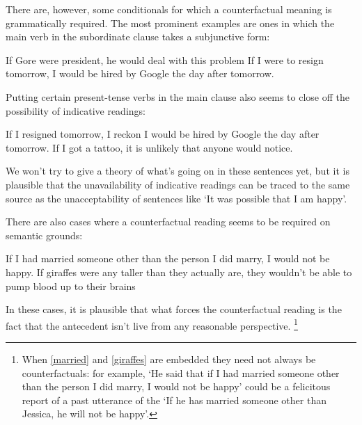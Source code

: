\documentclass[If.tex]{subfiles}
\begin{document}
There are, however, some conditionals for which a counterfactual meaning is grammatically required. The most prominent examples are ones in which the main verb in the subordinate clause takes a subjunctive form:
\begin{prop}
	\nitem 
		If Gore were president, he would deal with this problem
	\nitem 
		If I were to resign tomorrow, I would be hired by Google the day after tomorrow.
\end{prop}
Putting certain present-tense verbs in the main clause also seems to close off the possibility of indicative readings:
\begin{prop}
	\nitem 
		If I resigned tomorrow, I reckon I would be hired by Google the day after tomorrow.
	\nitem 
		If I got a tattoo, it is unlikely that anyone would notice.
\end{prop}
We won't try to give a theory of what's going on in these sentences yet, but it is plausible that the unavailability of indicative readings can be traced to the same source as the unacceptability of sentences like ‘It was possible that I am happy’.

There are also cases where a counterfactual reading seems to be required on semantic grounds:
\begin{prop}
	\nitem \label{married}
		If I had married someone other than the person I did marry, I would not be happy.
	\nitem \label{giraffes}
		If giraffes were any taller than they actually are, they wouldn't be able to pump blood up to their brains
\end{prop}
In these cases, it is plausible that what forces the counterfactual reading is the fact that the antecedent isn't live from any reasonable perspective.%
\footnote{When \ref{married} and \ref{giraffes} are embedded they need not always be counterfactuals: for example, ‘He said that if I had married someone other than the person I did marry, I would not be happy’ could be a felicitous report of a past utterance of the ‘If he has married someone other than Jessica, he will not be happy’.}
\end{document}
